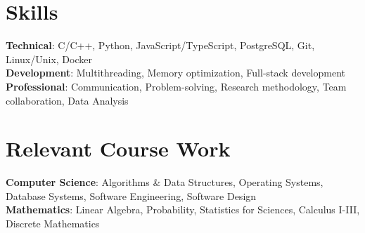 \documentclass[letterpaper,11pt]{article}
\begin{document}



\section{Skills}
\begin{itemize}[leftmargin=0.15in, label={}]
\small{\item{
\textbf{Technical}{: C/C++, Python, JavaScript/TypeScript, PostgreSQL, Git, Linux/Unix, Docker} \\
\textbf{Development}{: Multithreading, Memory optimization, Full-stack development} \\
\textbf{Professional}{: Communication, Problem-solving, Research methodology, Team collaboration, Data Analysis}}}
\end{itemize}



\section{Relevant Course Work}
\begin{itemize}[leftmargin=0.15in, label={}]
\small{\item{
\textbf{Computer Science}{: Algorithms \& Data Structures, Operating Systems, Database Systems, Software Engineering, Software Design} \\
\textbf{Mathematics}{: Linear Algebra, Probability, Statistics for Sciences, Calculus I-III, Discrete Mathematics}
}}
\end{itemize}
\end{document}
